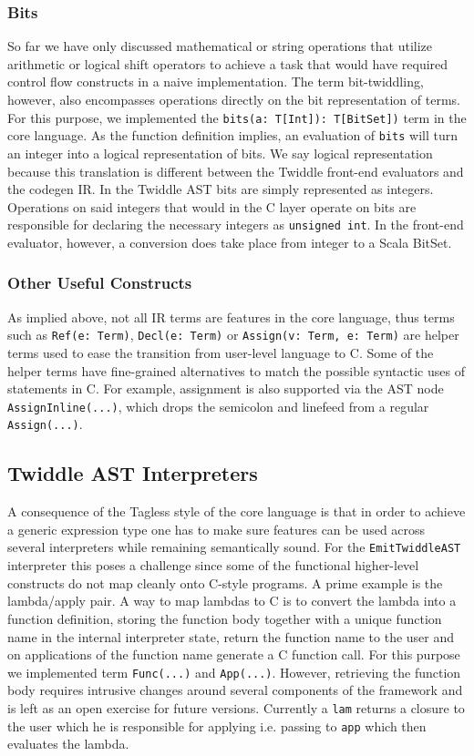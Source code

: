 \documentclass{article}
\begin{document}
\subsubsection{Bits}
So far we have only discussed mathematical or string operations that utilize arithmetic or logical shift operators to achieve a task that would have required control flow constructs in a naive implementation. The term bit-twiddling, however, also encompasses operations directly on the bit representation of terms. For this purpose, we implemented the \texttt{bits(a: T[Int]): T[BitSet])} term in the core language. As the function definition implies, an evaluation of \texttt{bits} will turn an integer into a logical representation of bits. We say logical representation because this translation is different between the Twiddle front-end evaluators and the codegen IR. In the Twiddle AST bits are simply represented as integers. Operations on said integers that would in the C layer operate on bits are responsible for declaring the necessary integers as \texttt{unsigned int}. In the front-end evaluator, however, a conversion does take place from integer to a Scala BitSet.

\subsubsection{Other Useful Constructs}
As implied above, not all IR terms are features in the core language, thus terms such as \texttt{Ref(e: Term)}, \texttt{Decl(e: Term)} or \texttt{Assign(v: Term, e: Term)} are helper terms used to ease the transition from user-level language to C. Some of the helper terms have fine-grained alternatives to match the possible syntactic uses of statements in C. For example, assignment is also supported via the AST node \texttt{AssignInline(...)}, which drops the semicolon and linefeed from a regular \texttt{Assign(...)}.

\subsection{Twiddle AST Interpreters}\label{subsec:ast_interpreter}
A consequence of the Tagless style of the core language is that in order to achieve a generic expression type one has to make sure features can be used across several interpreters while remaining semantically sound. For the \texttt{EmitTwiddleAST} interpreter this poses a challenge since some of the functional higher-level constructs do not map cleanly onto C-style programs. A prime example is the lambda/apply pair. A way to map lambdas to C is to convert the lambda into a function definition, storing the function body together with a unique function name in the internal interpreter state, return the function name to the user and on applications of the function name generate a C function call. For this purpose we implemented term \texttt{Func(...)} and \texttt{App(...)}. However, retrieving the function body requires intrusive changes around several components of the framework and is left as an open exercise for future versions. Currently a \texttt{lam} returns a closure to the user which he is responsible for applying i.e. passing to \texttt{app} which then evaluates the lambda.
\end{document}
